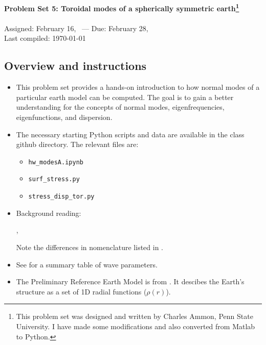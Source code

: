 \documentclass[11pt,titlepage,fleqn]{article}
\newcommand{\tfileA}{{\tt hw\_modesA.ipynb}}
\newcommand{\tfileB}{{\tt surf\_stress.py}}
\newcommand{\tfileC}{{\tt stress\_disp\_tor.py}}
\begin{document}

\begin{spacing}{1.2}
\centering
{\large \bf Problem Set 5: Toroidal modes of a spherically symmetric earth\footnote{This problem set was designed and written by Charles Ammon, Penn State University. I have made some modifications and also converted from Matlab to Python.}} \\
\cltag\ \\
Assigned: February 16, \cyear\ --- Due: February 28, \cyear\ \\
Last compiled: \today \\
\end{spacing}


\subsection*{Overview and instructions}

\begin{itemize}

\item This problem set provides a hands-on introduction to how normal modes of a particular earth model can be computed. The goal is to gain a better understanding for the concepts of normal modes, eigenfrequencies, eigenfunctions, and dispersion.

\item The necessary starting Python scripts and data are available in the class github directory. The relevant files are:
%
\begin{itemize}
\item \tfileA\
\item \tfileB\
\item \tfileC\
\end{itemize}

\item Background reading:

\citet[][Section 2.9]{SteinWysession}, \citet[][Ch.~8]{DT}

Note the differences in nomenclature listed in .

\item See  for a summary table of wave parameters.

\item The Preliminary Reference Earth Model is from \citet{PREM}. It descibes the Earth's structure as a set of 1D radial functions (\eg $\rho(r)$).

\end{itemize}
\end{document}
